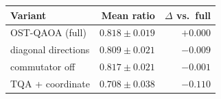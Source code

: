 \begin{tabular}{lrr}
\toprule
Variant & Mean ratio & $\Delta$ vs.\ full \\
\midrule
OST-QAOA (full) & $0.818\pm0.019$ & $+0.000$ \\
diagonal directions & $0.809\pm0.021$ & $-0.009$ \\
commutator off & $0.817\pm0.021$ & $-0.001$ \\
TQA + coordinate & $0.708\pm0.038$ & $-0.110$ \\
\bottomrule
\end{tabular}
